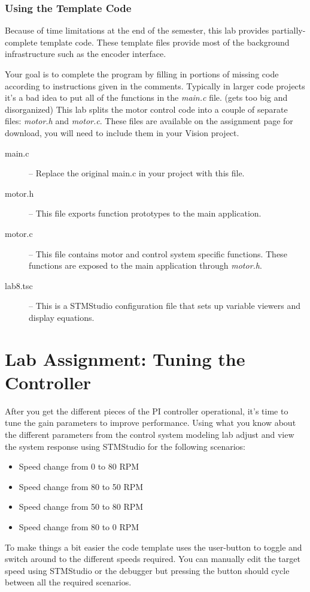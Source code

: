 \documentclass[11pt,fleqn]{book} %
\begin{document}
\subsubsection{Using the Template Code}
Because of time limitations at the end of the semester, this lab provides partially-complete template code. These template files provide most of the background infrastructure such as the encoder interface.

Your goal is to complete the program by filling in portions of missing code according to instructions given in the comments. Typically in larger code projects it's a bad idea to put all of the functions in the \textit{main.c} file. (gets too big and disorganized) This lab splits the motor control code into a couple of separate files: \textit{motor.h} and \textit{motor.c}. These files are available on the assignment page for download, you will need to include them in your {\textmu}Vision project.

\begin{description}
    \item[main.c] -- Replace the original main.c in your project with this file.
    \item[motor.h] -- This file exports function prototypes to the main application.
    \item[motor.c] -- This file contains motor and control system specific functions. These functions are exposed to the main application through \textit{motor.h}. 
    \item[lab8.tsc] -- This is a STMStudio configuration file that sets up variable viewers and display equations.
\end{description}

\section{Lab Assignment: Tuning the Controller}

After you get the different pieces of the PI controller operational, it's time to tune the gain parameters to improve performance. Using what you know about the different parameters from the control system modeling lab adjust and view the system response using STMStudio for the following scenarios:

\begin{itemize}
    \item Speed change from 0 to 80 RPM
    \item Speed change from 80 to 50 RPM
    \item Speed change from 50 to 80 RPM
    \item Speed change from 80 to 0 RPM 
\end{itemize}
To make things a bit easier the code template uses the user-button to toggle and switch around to the different speeds required. You can manually edit the target speed using STMStudio or the debugger but pressing the button should cycle between all the required scenarios. 
\end{document}
